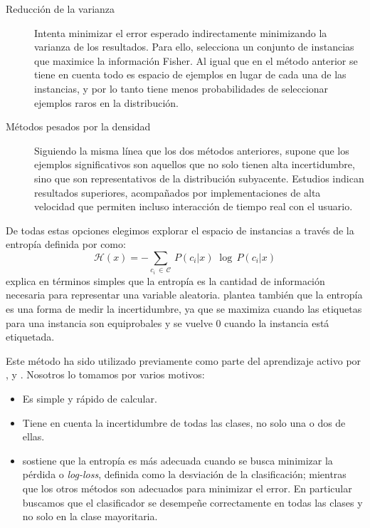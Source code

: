 \begin{description}
    \item[Reducción de la varianza] Intenta minimizar el error esperado
    indirectamente minimizando la varianza de los resultados. Para ello,
    selecciona un conjunto de instancias que maximice la información Fisher. Al
    igual que en el método anterior se tiene en cuenta todo es espacio de
    ejemplos en lugar de cada una de las instancias, y por lo tanto tiene menos
    probabilidades de seleccionar ejemplos raros en la distribución.
    \item[Métodos pesados por la densidad] Siguiendo la misma línea que los dos
    métodos anteriores, supone que los ejemplos significativos son aquellos
    que no solo tienen alta incertidumbre, sino que son representativos
    de la distribución subyacente. Estudios indican resultados superiores,
    acompañados por implementaciones de alta velocidad que permiten incluso
    interacción de tiempo real con el usuario.
\end{description}

De todas estas opciones elegimos explorar el espacio de instancias a través de la entropía definida por \citet{entropy-shannon} como:
\begin{equation*}
\mathcal{H}(x) = - \sum_{c_i\,\in\,\mathcal{C}} \, P(c_i|x)\; \log\,P(c_i|x)
\end{equation*}
\citet{information-theory-cover} explica en términos simples que la entropía es la cantidad de información necesaria para representar una variable aleatoria. \citet{multinomial-manning} plantea también que la entropía es una forma de medir la incertidumbre, ya que se maximiza cuando las etiquetas para una instancia son equiprobales y se vuelve 0 cuando la instancia está etiquetada.

Este método ha sido utilizado previamente como parte del aprendizaje activo por \citet{entropy-or}, \citet{settles-entropy} y \citet{Hwa-entropy}. Nosotros lo tomamos por varios motivos:
\begin{itemize}
    \item Es simple y rápido de calcular.
    \item Tiene en cuenta la incertidumbre de todas las clases, no solo una o dos de ellas.
    \item \citet{settles_active_learning_survey} sostiene que la entropía es más adecuada cuando se busca minimizar la pérdida o \textit{log-loss}, definida como la desviación de la clasificación; mientras que los otros métodos son adecuados para minimizar el error. En particular buscamos que el clasificador se desempeñe correctamente en todas las clases y no solo en la clase mayoritaria.
\end{itemize}


